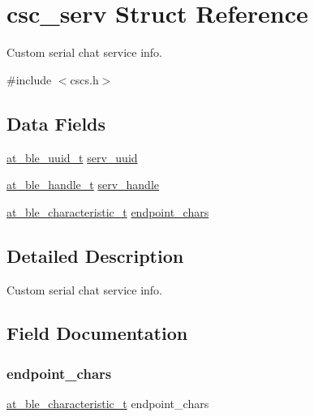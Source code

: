 \hypertarget{structcsc__serv}{}\section{csc\+\_\+serv Struct Reference}
\label{structcsc__serv}


Custom serial chat service info.  




{\ttfamily \#include $<$cscs.\+h$>$}

\subsection*{Data Fields}
\begin{DoxyCompactItemize}
\item 
\mbox{\hyperlink{structat__ble__uuid__t}{at\+\_\+ble\+\_\+uuid\+\_\+t}} \mbox{\hyperlink{structcsc__serv_a4224f62d8329c28f97ce9e3a9e8782e8}{serv\+\_\+uuid}}
\item 
\mbox{\hyperlink{at__ble__api_8h_abd23646d0c662860741f787efc8456f2}{at\+\_\+ble\+\_\+handle\+\_\+t}} \mbox{\hyperlink{structcsc__serv_aca01574e34f7351ca2e1fabdfa5b688a}{serv\+\_\+handle}}
\item 
\mbox{\hyperlink{structat__ble__characteristic__t}{at\+\_\+ble\+\_\+characteristic\+\_\+t}} \mbox{\hyperlink{structcsc__serv_a259e892c8bd22dc7b8913e2bf80b5ad4}{endpoint\+\_\+chars}}
\end{DoxyCompactItemize}


\subsection{Detailed Description}
Custom serial chat service info. 

\subsection{Field Documentation}
\mbox{\label{structcsc__serv_a259e892c8bd22dc7b8913e2bf80b5ad4}} 
\subsubsection{\texorpdfstring{endpoint\_chars}{endpoint\_chars}}
{\footnotesize\ttfamily \mbox{\hyperlink{structat__ble__characteristic__t}{at\+\_\+ble\+\_\+characteristic\+\_\+t}} endpoint\+\_\+chars}

